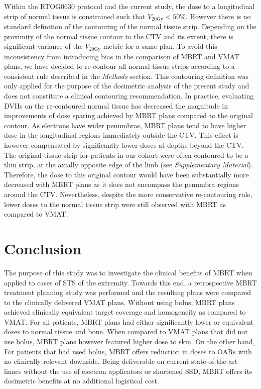 \documentclass[aapm,graphicx,superscriptaddress]{revtex4-1}
\begin{document}
Within the RTOG0630 protocol \cite{RTOG0630} and the current study, the dose to a longitudinal strip of normal tissue is constrained such that $V_\text{20Gy} < 50\%$. However there is no standard definition of the contouring of the normal tissue strip. Depending on the proximity of the normal tissue contour to the CTV and its extent, there is significant variance of the $V_\text{20Gy}$ metric for a same plan. To avoid this inconsistency from introducing bias in the comparison of MBRT and VMAT plans, we have decided to re-contour all normal tissue strips according to a consistent rule described in the \textit{Methods} section. This contouring definition was only applied for the purpose of the dosimetric analysis of the present study and does not constitute a clinical contouring recommendation. In practice, evaluating DVHs on the re-contoured normal tissue has decreased the magnitude in improvements of dose sparing achieved by MBRT plans compared to the original contour. As electrons have wider penumbras, MBRT plans tend to have higher dose in the longitudinal regions immediately outside the CTV. This effect is however compensated by significantly lower doses at depths beyond the CTV. The original tissue strip for patients in our cohort were often contoured to be a thin strip, at the axially opposite edge of the limb (see \textit{Supplementary Material}). Therefore, the dose to this original contour would have been substantially more decreased with MBRT plans as it does not encompass the penumbra regions around the CTV. Nevertheless, despite the more conservative re-contouring rule, lower doses to the normal tissue strip were still observed with MBRT as compared to VMAT. 


\section{Conclusion}

The purpose of this study was to investigate the clinical benefits of MBRT when applied to cases of STS of the extremity. Towards this end, a retrospective MBRT treatment planning study was performed and the resulting plans were compared to the clinically delivered VMAT plans. Without using bolus, MBRT plans achieved clinically equivalent target coverage and homogeneity as compared to VMAT. For all patients, MBRT plans had either significantly lower or equivalent doses to normal tissue and bone. When compared to VMAT plans that did not use bolus, MBRT plans however featured higher dose to skin. On the other hand, For patients that had used bolus, MBRT offers reduction in doses to OARs with no clinically relevant downside. Being deliverable on current state-of-the-art linacs without the use of electron applicators or shortened SSD, MBRT offers its dosimetric benefits at no additional logistical cost. 
\end{document}
